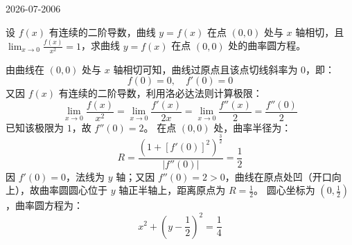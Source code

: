 \begin{mistake}{2026-07-20}{06}

\begin{problemcontent}
设 \(f(x)\) 有连续的二阶导数，曲线 \(y=f(x)\) 在点 \((0,0)\) 处与 \(x\) 轴相切，且 \(\lim_{x\to 0}\frac{f(x)}{x^2}=1\)，求曲线 \(y=f(x)\) 在点 \((0,0)\) 处的曲率圆方程。
\end{problemcontent}

\begin{solutioncontent}
由曲线在 \((0,0)\) 处与 \(x\) 轴相切可知，曲线过原点且该点切线斜率为 \(0\)，即：
\[ f(0) = 0, \quad f'(0) = 0 \]
又因 \(f(x)\) 有连续的二阶导数，利用洛必达法则计算极限：
\[ \lim_{x\to 0}\frac{f(x)}{x^2} = \lim_{x\to 0}\frac{f'(x)}{2x} = \lim_{x\to 0}\frac{f''(x)}{2} = \frac{f''(0)}{2} \]
已知该极限为 \(1\)，故 \(f''(0) = 2\)。
在点 \((0,0)\) 处，曲率半径为：
\[ R = \frac{(1+[f'(0)]^2)^{\frac{3}{2}}}{|f''(0)|} = \frac{1}{2} \]
因 \(f'(0)=0\)，法线为 \(y\) 轴；又因 \(f''(0) = 2 > 0\)，曲线在原点处凹（开口向上），故曲率圆圆心位于 \(y\) 轴正半轴上，距离原点为 \(R = \frac{1}{2}\)。
圆心坐标为 \((0, \frac{1}{2})\)，曲率圆方程为：
\[ x^2 + \left(y - \frac{1}{2}\right)^2 = \frac{1}{4} \]
\end{solutioncontent}


\end{mistake}
